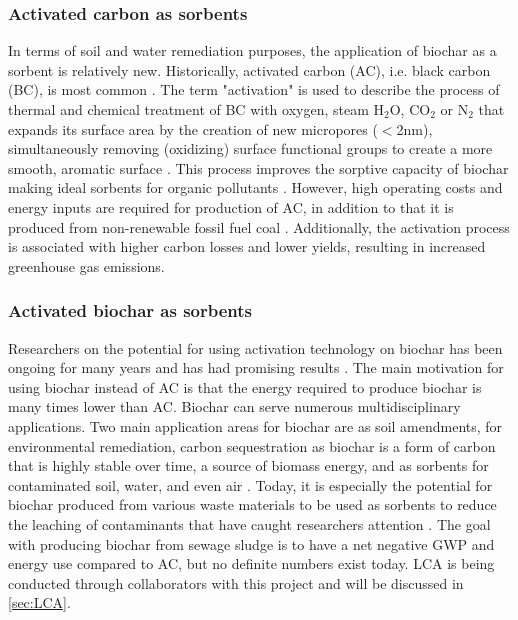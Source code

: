 \subsubsection{Activated carbon as sorbents}
In terms of soil and water remediation purposes, the application of biochar as a sorbent is relatively new. Historically, activated carbon (AC), i.e. black carbon (BC), is most common \citep{Cornelissen2005}. The term "activation" is used to describe the process of thermal and chemical treatment of BC with oxygen, steam $\mathrm{H_2O}$, $\mathrm{CO_2}$ or $\mathrm{N_2}$ that expands its surface area by the creation of new micropores ($<$2nm), simultaneously removing (oxidizing) surface functional groups to create a more smooth, aromatic surface \citep{sajjadi2019comprehensive}. This process improves the sorptive capacity of biochar making ideal sorbents for organic pollutants \citep{Ahmad2014}. However, high operating costs and energy inputs are required for production of AC, in addition to that it is produced from non-renewable fossil fuel coal \citep{Li2019}. Additionally, the activation process is associated with higher carbon losses and lower yields, resulting in increased greenhouse gas emissions.

\subsubsection{Activated biochar as sorbents}
Researchers on the potential for using activation technology on biochar has been ongoing for many years and has had promising results \citep{Sormo2021}. The main motivation for using biochar instead of AC is that the energy required to produce biochar is many times lower than AC. Biochar can serve numerous multidisciplinary applications. Two main application areas for biochar are as soil amendments, for environmental remediation, carbon sequestration as biochar is a form of carbon that is highly stable over time, a source of biomass energy, and as sorbents for contaminated soil, water, and even air \citep{Ahmad2014}. Today, it is especially the potential for biochar produced from various waste materials to be used as sorbents to reduce the leaching of contaminants that have caught researchers attention \citep{Cornelissen2011Capping, Kupryianchyk2016b, Sormo2021, zhou2010sorption}. The goal with producing biochar from sewage sludge is to have a net negative GWP and energy use compared to AC, but no definite numbers exist today. LCA is being conducted through collaborators with this project and will be discussed in \cref{sec:LCA}. 

